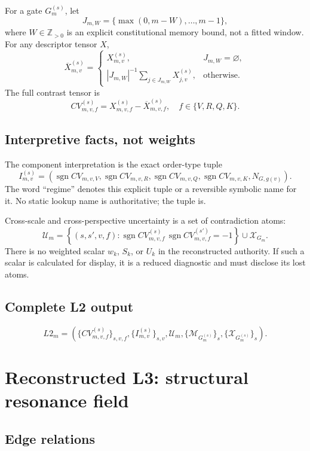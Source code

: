 \documentclass[11pt,oneside]{article}
\newcommand{\Z}{\mathbb{Z}}
\newcommand{\sgn}{\operatorname{sgn}}
\begin{document}
For a gate \(G^{(s)}_m\), let
\[
  J_{m,W}=\{\max(0,m-W),\ldots,m-1\},
\]
where \(W\in\Z_{>0}\) is an explicit constitutional memory bound, not a fitted
window. For any descriptor tensor \(X\),
\[
  \overline{X}^{(s)}_{m,v}
  =
  \begin{cases}
  X^{(s)}_{m,v},&J_{m,W}=\varnothing,\\[2mm]
  |J_{m,W}|^{-1}
    \sum_{j\in J_{m,W}}X^{(s)}_{j,v},&\text{otherwise}.
  \end{cases}
\]
The full contrast tensor is
\[
  CV^{(s)}_{m,v,f}
  =X^{(s)}_{m,v,f}-\overline{X}^{(s)}_{m,v,f},
  \quad
  f\in\{V,R,Q,K\}.
\]

\subsection{Interpretive facts, not weights}

The component interpretation is the exact order-type tuple
\[
  I^{(s)}_{m,v}
  =
  \left(
    \sgn CV_{m,v,V},
    \sgn CV_{m,v,R},
    \sgn CV_{m,v,Q},
    \sgn CV_{m,v,K},
    N_{G,g(v)}
  \right).
\]
The word ``regime'' denotes this explicit tuple or a reversible symbolic name
for it. No static lookup name is authoritative; the tuple is.

Cross-scale and cross-perspective uncertainty is a set of contradiction atoms:
\[
  \mathcal{U}_m=
  \left\{
  (s,s',v,f):
  \sgn CV^{(s)}_{m,v,f}\,
  \sgn CV^{(s')}_{m,v,f}=-1
  \right\}
  \cup \mathcal{X}_{G_m}.
\]
There is no weighted scalar \(w_k\), \(S_k\), or \(U_k\) in the reconstructed
authority. If such a scalar is calculated for display, it is a reduced
diagnostic and must disclose its lost atoms.

\subsection{Complete L2 output}

\[
  L2_m=
  \left(
    \{CV^{(s)}_{m,v,f}\}_{s,v,f},
    \{I^{(s)}_{m,v}\}_{s,v},
    \mathcal{U}_m,
    \{\mathcal{M}_{G^{(s)}_m}\}_s,
    \{\mathcal{X}_{G^{(s)}_m}\}_s
  \right).
\]

\section{Reconstructed L3: structural resonance field}

\subsection{Edge relations}
\end{document}
